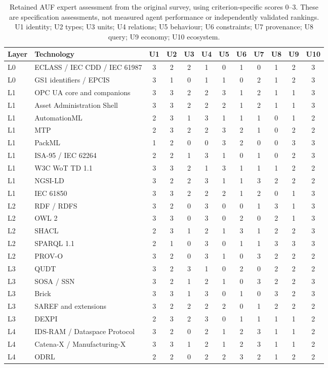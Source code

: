 \begin{table}[t]
\centering\footnotesize
\caption{Retained AUF expert assessment from the original survey, using criterion-specific scores 0--3. These are specification assessments, not measured agent performance or independently validated rankings. U1 identity; U2 types; U3 units; U4 relations; U5 behaviour; U6 constraints; U7 provenance; U8 query; U9 economy; U10 ecosystem.}
\label{tab:auf-matrix}
\setlength{\tabcolsep}{4pt}
\begin{tabular}{@{}llcccccccccc@{}}
\toprule
Layer & Technology & U1 & U2 & U3 & U4 & U5 & U6 & U7 & U8 & U9 & U10 \\
\midrule
L0 & ECLASS / IEC CDD / IEC 61987 & 3&2&2&1&0&1&0&1&2&3 \\
L0 & GS1 identifiers / EPCIS & 3&1&0&1&1&0&2&1&2&3 \\
L1 & OPC UA core and companions & 3&3&2&2&3&1&2&1&1&3 \\
L1 & Asset Administration Shell & 3&3&2&2&2&1&2&1&1&3 \\
L1 & AutomationML & 2&3&1&3&1&1&1&0&1&2 \\
L1 & MTP & 2&3&2&2&3&2&1&0&2&2 \\
L1 & PackML & 1&2&0&0&3&2&0&0&3&3 \\
L1 & ISA-95 / IEC 62264 & 2&2&1&3&1&0&1&0&2&3 \\
L1 & W3C WoT TD 1.1 & 3&3&2&1&3&1&1&1&2&2 \\
L1 & NGSI-LD & 3&2&2&3&1&1&3&2&2&2 \\
L1 & IEC 61850 & 3&3&2&2&2&1&2&0&1&3 \\
L2 & RDF / RDFS & 3&2&0&3&0&0&1&3&1&3 \\
L2 & OWL 2 & 3&3&0&3&0&2&0&2&1&3 \\
L2 & SHACL & 2&3&1&2&1&3&1&2&2&3 \\
L2 & SPARQL 1.1 & 2&1&0&3&0&1&1&3&3&3 \\
L2 & PROV-O & 3&2&0&3&1&0&3&2&2&2 \\
L3 & QUDT & 3&2&3&1&0&2&0&2&2&2 \\
L3 & SOSA / SSN & 3&2&1&2&1&0&3&2&2&3 \\
L3 & Brick & 3&3&1&3&0&1&0&3&2&3 \\
L3 & SAREF and extensions & 3&2&2&2&2&0&1&2&2&2 \\
L3 & DEXPI & 2&3&2&3&0&1&1&1&1&2 \\
L4 & IDS-RAM / Dataspace Protocol & 3&2&0&2&1&2&3&1&1&2 \\
L4 & Catena-X / Manufacturing-X & 3&3&1&2&1&2&3&1&1&2 \\
L4 & ODRL & 2&2&0&2&2&3&2&1&2&2 \\
\bottomrule
\end{tabular}
\end{table}